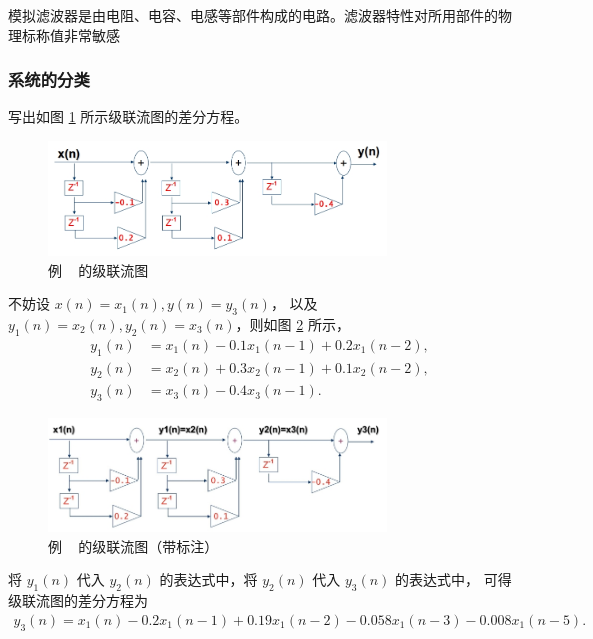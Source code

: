 \begin{definition}
    模拟滤波器是由电阻、电容、电感等部件构成的电路。滤波器特性对所用部件的物理标称值非常敏感
\end{definition}

\subsubsection{系统的分类}





\begin{example}
    \label{exercise:serial-flow-chart}
    写出如图 \ref{fig:serial-flow-chart} 所示级联流图的差分方程。
    \begin{figure}[H]
        \centering
        \includegraphics[width=0.8\textwidth]{chap4/img/serial_flow_chart.png}
        \caption{例 \theexample~ 的级联流图}
        \label{fig:serial-flow-chart}
    \end{figure}
\end{example}

\begin{solution}
    不妨设 $x(n) = x_1(n), y(n) = y_3(n)$，
    以及 $y_1(n) = x_2(n), y_2(n) = x_3(n)$，则如图 \ref{fig:serial-flow-chart-annotated} 所示，
    \begin{align*}
        y_1(n) & = x_1(n) - 0.1x_1(n - 1) + 0.2x_1(n - 2), \\
        y_2(n) & = x_2(n) + 0.3x_2(n - 1) + 0.1x_2(n - 2), \\
        y_3(n) & = x_3(n) - 0.4x_3(n - 1).
    \end{align*}
    \begin{figure}[H]
        \centering
        \includegraphics[width=0.8\textwidth]{chap4/img/serial_flow_chart_annotated.png}
        \caption{例 \theexample~ 的级联流图（带标注）}
        \label{fig:serial-flow-chart-annotated}
    \end{figure}
    将 $y_1(n)$ 代入 $y_2(n)$ 的表达式中，将 $y_2(n)$ 代入 $y_3(n)$ 的表达式中，
    可得级联流图的差分方程为
    \begin{align*}
        y_3(n) = x_1(n) - 0.2x_1(n - 1) + 0.19x_1(n - 2) - 0.058x_1(n - 3) - 0.008x_1(n - 5).
    \end{align*}
\end{solution}

